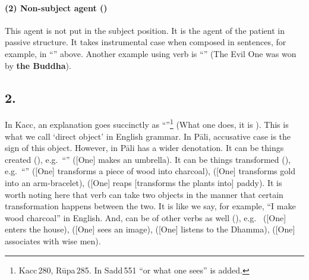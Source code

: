 \paragraph*{(2) Non-subject agent ()} This agent is not put in the subject position. It is the agent of the patient in passive structure. It takes instrumental case when composed in sentences, for example,  in ``'' above. Another example using  verb is ``'' (The Evil One was won by \textbf{the Buddha}).

{}
\subsection*{2.\,}

In Kacc, an explanation goes succinctly as ``''\footnote{Kacc\,280, R\=upa\,285. In Sadd\,551 ``or what one sees'' is added.} (What one does, it is ). This is what we call `direct object' in English grammar. In P\=ali, accusative case is the sign of this object. However, in P\=ali  has a wider denotation. It can be things created (), e.g.\ ``'' ([One] makes an umbrella). It can be things transformed (), e.g.\ ``'' ([One] transforms a piece of wood into charcoal),  ([One] transforms gold into an arm-bracelet),  ([One] reaps [transforms the plants into] paddy). It is worth noting here that verb  can take two objects in the manner that certain transformation happens between the two. It is like we say, for example, ``I make wood charcoal'' in English. And,  can be of other verbs as well (), e.g.\  ([One] enters the house),  ([One] sees an image),  ([One] listens to the Dhamma),  ([One] associates with wise men).

